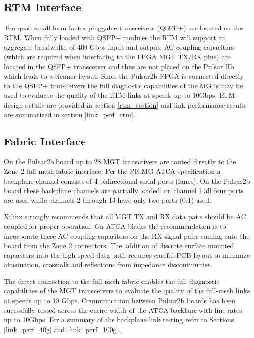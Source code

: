 \documentclass[letterpaper]{article}
\begin{document}
\subsection{RTM Interface}

Ten quad small form factor pluggable transceivers (QSFP+) are located on the RTM.  When fully loaded with QSFP+ modules the RTM will support an aggregate bandwidth of 400 Gbps input and output.  AC coupling capacitors (which are required when interfacing to the FPGA MGT TX/RX pins) are located in the QSFP+ transceiver and thus are not placed on the Pulsar IIb which leads to a cleaner layout.  Since the Pulsar2b FPGA is connected directly to the QSFP+ transceivers the full diagnostic capabilities of the MGTs may be used to evaluate the quality of the RTM links at speeds up to 10Gbps.  RTM design details are provided in section \ref{rtm_section} and link performance results are summarized in section \ref{link_perf_rtm}.

\subsection{Fabric Interface}

On the Pulsar2b board up to 28 MGT transceivers are routed directly to the Zone 2 full mesh fabric interface.  Per the PICMG ATCA specification a backplane channel consists of 4 bidirectional serial ports (lanes).  On the Pulsar2b board these backplane channels are partially loaded: on channel 1 all four ports are used while channels 2 through 13 have only two ports (0,1) used.  

Xilinx strongly recommends that all MGT TX and RX data pairs should be AC coupled for proper operation.  On ATCA blades the recommendation is to incorporate these AC coupling capacitors on the RX signal pairs coming onto the board from the Zone 2 connectors.  The addition of discrete surface mounted capacitors into the high speed data path requires careful PCB layout to minimize attenuation, crosstalk and reflections from impedance discontinuities.

The direct connection to the full-mesh fabric enables the full diagnostic capabilities of the MGT transceivers to evaluate the quality of the full-mesh links at speeds up to 10 Gbps.  Communication between Pulsar2b boards has been sucessfully tested across the entire width of the ATCA backlane with line rates up to 10Gbps.  For a summary of the backplane link testing refer to Sections \ref{link_perf_40g} and \ref{link_perf_100g}.
\end{document}
